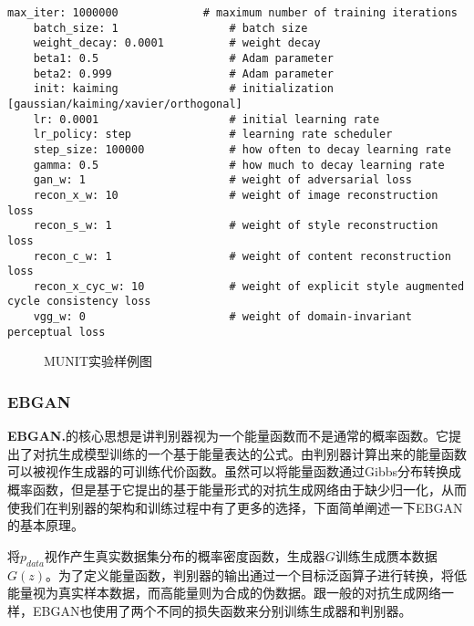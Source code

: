 \begin{lstlisting}[basicstyle=\small, caption={MUNIT主要优化参数配置}, captionpos=b]
    max_iter: 1000000             # maximum number of training iterations
    batch_size: 1                 # batch size
    weight_decay: 0.0001          # weight decay
    beta1: 0.5                    # Adam parameter
    beta2: 0.999                  # Adam parameter
    init: kaiming                 # initialization [gaussian/kaiming/xavier/orthogonal]
    lr: 0.0001                    # initial learning rate
    lr_policy: step               # learning rate scheduler
    step_size: 100000             # how often to decay learning rate
    gamma: 0.5                    # how much to decay learning rate
    gan_w: 1                      # weight of adversarial loss
    recon_x_w: 10                 # weight of image reconstruction loss
    recon_s_w: 1                  # weight of style reconstruction loss
    recon_c_w: 1                  # weight of content reconstruction loss
    recon_x_cyc_w: 10             # weight of explicit style augmented cycle consistency loss
    vgg_w: 0                      # weight of domain-invariant perceptual loss
\end{lstlisting}

\begin{figure}[h]
    \caption{MUNIT实验样例图}
\end{figure}

\subsubsection[EBGAN]{EBGAN}

\textbf{EBGAN.}\cite{ebgan}\quad 的核心思想是讲判别器视为一个能量函数而不是通常的概率函数。它提出了对抗生成模型训练的一个基于能量表达的公式。由判别器计算出来的能量函数可以被视作生成器的可训练代价函数。虽然可以将能量函数通过Gibbs分布转换成概率函数，但是基于它提出的基于能量形式的对抗生成网络由于缺少归一化，从而使我们在判别器的架构和训练过程中有了更多的选择，下面简单阐述一下EBGAN的基本原理。

将$p_{data}$视作产生真实数据集分布的概率密度函数，生成器$G$训练生成赝本数据$G(z)$。为了定义能量函数，判别器的输出通过一个目标泛函算子进行转换，将低能量视为真实样本数据，而高能量则为合成的伪数据。跟一般的对抗生成网络一样，EBGAN也使用了两个不同的损失函数来分别训练生成器和判别器。

